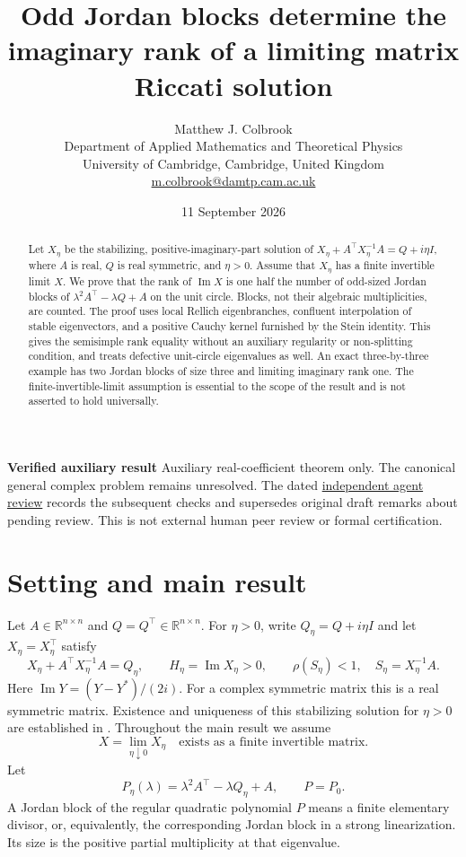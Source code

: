 \documentclass[11pt]{article}
\title{Odd Jordan blocks determine the imaginary rank of a limiting matrix Riccati solution}
\author{Matthew J. Colbrook\\\small Department of Applied Mathematics and Theoretical Physics\\\small University of Cambridge, Cambridge, United Kingdom\\\small\href{mailto:m.colbrook@damtp.cam.ac.uk}{m.colbrook@damtp.cam.ac.uk}}
\date{11 September 2026}
\newcommand{\R}{\mathbb R}
\newcommand{\Ima}{\operatorname{Im}}
\begin{document}
\maketitle

\noindent\textbf{Verified auxiliary result} Auxiliary real-coefficient theorem only. The canonical general complex problem remains unresolved.
The dated \href{https://github.com/MColbrook/OpenProblemsInNLA/blob/codex/colbrook-matrix-function-resolutions/references/colbrook-matrix-functions-2026-09-11/verification/reviews/MF-18-review.md}{independent agent review} records the subsequent checks and supersedes original draft remarks about pending review. This is not external human peer review or formal certification.
\par\medskip

\begin{abstract}
Let $X_\eta$ be the stabilizing, positive-imaginary-part solution of
$X_\eta+A^\top X_\eta^{-1}A=Q+i\eta I$, where $A$ is real, $Q$ is real symmetric, and $\eta>0$.
Assume that $X_\eta$ has a finite invertible limit $X$.
We prove that the rank of $\Ima X$ is one half the number of odd-sized Jordan blocks of
$\lambda^2A^\top-\lambda Q+A$ on the unit circle. Blocks, not their algebraic multiplicities, are counted.
The proof uses local Rellich eigenbranches, confluent interpolation of stable eigenvectors,
and a positive Cauchy kernel furnished by the Stein identity.
This gives the semisimple rank equality without an auxiliary regularity or non-splitting condition,
and treats defective unit-circle eigenvalues as well.
An exact three-by-three example has two Jordan blocks of size three and limiting imaginary rank one.
The finite-invertible-limit assumption is essential to the scope of the result and is not asserted to hold universally.
\end{abstract}

\section{Setting and main result}
Let $A\in\R^{n\times n}$ and $Q=Q^\top\in\R^{n\times n}$.
For $\eta>0$, write $Q_\eta=Q+i\eta I$ and let $X_\eta=X_\eta^\top$ satisfy
\begin{equation}\label{eq:riccati}
X_\eta+A^\top X_\eta^{-1}A=Q_\eta,
\qquad H_\eta=\Ima X_\eta>0,
\qquad \rho(S_\eta)<1,\quad S_\eta=X_\eta^{-1}A.
\end{equation}
Here $\Ima Y=(Y-Y^*)/(2i)$. For a complex symmetric matrix this is a real symmetric matrix.
Existence and uniqueness of this stabilizing solution for $\eta>0$ are established in
\cite[Theorem~2.2 and Remark~2.1]{GKL}. Throughout the main result we assume
\begin{equation}\label{eq:limit}
X=\lim_{\eta\downarrow0}X_\eta\quad\text{exists as a finite invertible matrix}.
\end{equation}
Let
\[
P_\eta(\lambda)=\lambda^2A^\top-\lambda Q_\eta+A,\qquad P=P_0.
\]
A Jordan block of the regular quadratic polynomial $P$ means a finite elementary divisor,
or, equivalently, the corresponding Jordan block in a strong linearization.
Its size is the positive partial multiplicity at that eigenvalue.
\end{document}
